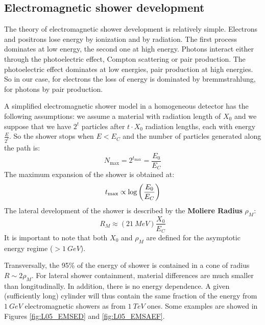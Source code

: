 \documentclass[../../main/main.tex]{subfiles}
\begin{document}
\subsection{Electromagnetic shower development}
The theory of electromagnetic shower development is relatively simple. Electrons and positrons lose energy by ionization and by radiation. The first process dominates at low energy, the second one at high energy. Photons interact either through the photoelectric effect, Compton scattering or pair production. The photoelectric effect dominates at low energies, pair production at high energies. So in our case, for electrons the loss of energy is dominated by bremmstrahlung, for photons by pair production.

A simplified electromagnetic shower model in a homogeneous detector has the following assumptions: we assume a material with radiation length of \( X_0 \) and we suppose that we have \( 2^t \) particles after \( t \cdot X_0 \) radiation lengths, each with energy \( \frac{E}{2^t} \). So the shower stops when \( E < E_C \) and the number of particles generated along the path is:
\begin{equation}
	N_\mathrm{max}
	=
	2^{t_\mathrm{max}}
	=
	\frac{E_0}{E_C}
	\label{eq:L05_EMSNOP}
\end{equation}
The maximum expansion of the shower is obtained at:
\begin{equation}
	t_\mathrm{max}
	\propto
	\log \qty(\frac{E_0}{E_C})
	\label{eq:L05_EMSME}
\end{equation}
The lateral development of the shower is described by the \textbf{Moliere Radius} \( \rho_M \):
\begin{equation}
	R_M
	\approx
	(21 \ \si{MeV}) \frac{X_0}{E_C}
	\label{eq:L05_EMSMR}
\end{equation}
It is important to note that both \( X_0 \) and \( \rho_M \) are defined for the asymptotic energy regime (\( > 1 \ \si{GeV} \)).

Transversally, the 95\% of the energy of shower is contained in a cone of radius \( R \sim 2\rho_M \). For lateral shower containment, material differences are much smaller than longitudinally. In addition, there is no energy dependence. A given (sufficiently long) cylinder will thus contain the same fraction of the energy from \( 1 \ \si{GeV} \) electromagnetic showers as from \( 1 \ \si{TeV} \) ones. Some examples are showed in Figures \ref{fig:L05_EMSED} and \ref{fig:L05_EMSAEF}.
\end{document}
